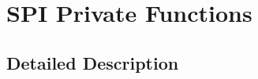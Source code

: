\hypertarget{group___s_d___s_p_i___private___functions}{}\section{S\+PI Private Functions}
\label{group___s_d___s_p_i___private___functions}


\subsection{Detailed Description}
